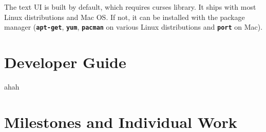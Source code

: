 \documentclass[12pt, a4paper]{article}
\newcommand{\cmdinline}[1]{{\bf \texttt{#1}}}
\begin{document}
The text UI is built by default, which requires curses library.
It ships with most Linux distributions and Mac OS. If not, it can be installed with the package manager (\cmdinline{apt-get}, \cmdinline{yum}, \cmdinline{pacman} on various Linux distributions and \cmdinline{port} on Mac).

\newpage
\section{Developer Guide}
ahah

\newpage
\section{Milestones and Individual Work}
\end{document}
